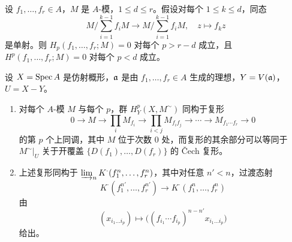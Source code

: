 \begin{exercises}
\item \label{ex:2.4.1} 设 $f_1,\dots,f_r\in A$，$M$ 是 $A$-模，$1\le d\le r$。假设对每个 $1\le k\le d$，同态
\[
M\Big/\sum_{i=1}^{k-1}f_iM\to M\Big/\sum_{i=1}^{k-1}f_iM,\quad z\mapsto f_kz
\]
是单射。则 $H_p(f_1,\dots,f_r;M)=0$ 对每个 $p>r-d$ 成立，且 $H^p(f_1,\dots,f_r;M)=0$ 对每个 $p<d$ 成立。

\item \label{ex:2.4.2} 设 $X=\operatorname{Spec} A$ 是仿射概形，$\mathfrak{a}$ 是由 $f_1,\dots,f_r\in A$ 生成的理想，$Y=V(\mathfrak{a})$，$U=X-Y$。
\begin{enumerate}[label=(\arabic*),leftmargin=2.4em]
  \item 对每个 $A$-模 $M$ 与每个 $p$，群 $H^p_Y(X,M^{\sim})$ 同构于复形
  \[
  0\to M\to\prod_i M_{f_i}\to\prod_{i<j}M_{f_if_j}\to\cdots\to M_{f_1\cdots f_r}\to 0
  \]
  的第 $p$ 个上同调，其中 $M$ 位于次数 $0$ 处，而复形的其余部分可以等同于 $M^{\sim}|_U$ 关于开覆盖 $\{D(f_1),\dots,D(f_r)\}$ 的 \v{C}ech 复形。
  \item 上述复形同构于 $\varinjlim_n K^{\cdot}(f_1^n,\dots,f_r^n)$，其中对任意 $n'<n$，过渡态射
  \[
  K^{\cdot}(f_1^{n'},\dots,f_r^{n'})\to K^{\cdot}(f_1^n,\dots,f_r^n)
  \]
  由
  \[
  (x_{i_1\dots i_p})\mapsto\bigl((f_{i_1}\cdots f_{i_p})^{n-n'}x_{i_1\dots i_p}\bigr)
  \]
  给出。
\end{enumerate}


\end{exercises}
